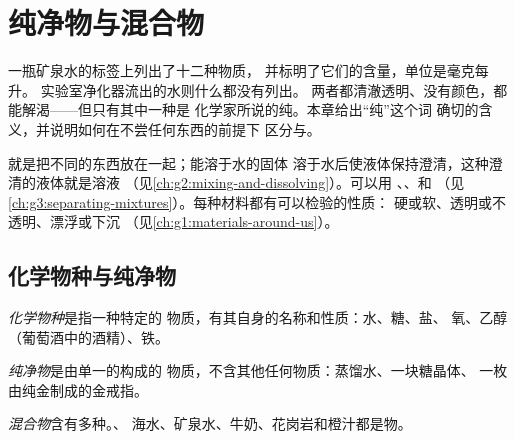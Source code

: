 \chapter{纯净物与混合物}\label{ch:g6:pure-substances-and-mixtures}

一瓶矿泉水的标签上列出了十二种物质，
并标明了它们的含量，单位是毫克每升。
实验室净化器流出的水则什么都没有列出。
两者都清澈透明、没有颜色，都能解渴——但只有其中一种是
化学家所说的纯。本章给出“纯”这个词
确切的含义，并说明如何在不尝任何东西的前提下
区分与。

\begin{recall}
就是把不同的东西放在一起；能溶于水的固体
溶于水后使液体保持澄清，这种澄清的液体就是溶液
（见\cref{ch:g2:mixing-and-dissolving}）。可以用
、、和
（见\cref{ch:g3:separating-mixtures}）。每种材料都有可以检验的性质：
硬或软、透明或不透明、漂浮或下沉
（见\cref{ch:g1:materials-around-us}）。
\end{recall}

\section{化学物种与纯净物}

\begin{definition}[化学物种]\label{def:g6:pure-substances-and-mixtures:species}
\emph{化学物种}是指一种特定的
物质，有其自身的名称和性质：水、糖、盐、
氧、乙醇（葡萄酒中的酒精）、铁。
\end{definition}

\begin{definition}[纯净物]\label{def:g6:pure-substances-and-mixtures:pure-substance}
\emph{纯净物}是由单一的构成的
物质，不含其他任何物质：蒸馏水、一块糖晶体、
一枚由纯金制成的金戒指。
\end{definition}

\begin{definition}[混合物]\label{def:g6:pure-substances-and-mixtures:mixture}
\emph{混合物}含有多种。、
海水、矿泉水、牛奶、花岗岩和橙汁都是物。
\end{definition}


